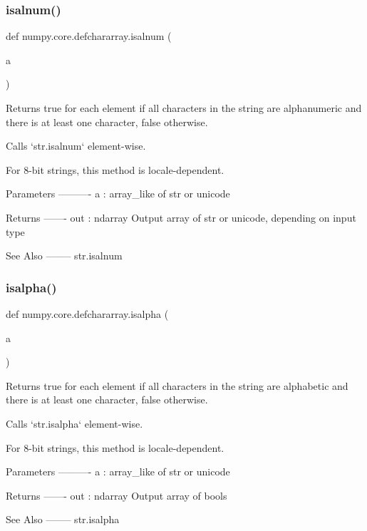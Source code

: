 \subsubsection{\texorpdfstring{isalnum()}{isalnum()}}
{\footnotesize\ttfamily def numpy.\+core.\+defchararray.\+isalnum (\begin{DoxyParamCaption}\item[{}]{a }\end{DoxyParamCaption})}

\begin{DoxyVerb}Returns true for each element if all characters in the string are
alphanumeric and there is at least one character, false otherwise.

Calls `str.isalnum` element-wise.

For 8-bit strings, this method is locale-dependent.

Parameters
----------
a : array_like of str or unicode

Returns
-------
out : ndarray
    Output array of str or unicode, depending on input type

See Also
--------
str.isalnum
\end{DoxyVerb}
 \mbox{\label{namespacenumpy_1_1core_1_1defchararray_a8b11c782e2ae766787863211cd831dba}} 
\subsubsection{\texorpdfstring{isalpha()}{isalpha()}}
{\footnotesize\ttfamily def numpy.\+core.\+defchararray.\+isalpha (\begin{DoxyParamCaption}\item[{}]{a }\end{DoxyParamCaption})}

\begin{DoxyVerb}Returns true for each element if all characters in the string are
alphabetic and there is at least one character, false otherwise.

Calls `str.isalpha` element-wise.

For 8-bit strings, this method is locale-dependent.

Parameters
----------
a : array_like of str or unicode

Returns
-------
out : ndarray
    Output array of bools

See Also
--------
str.isalpha
\end{DoxyVerb}
 \mbox{\label{namespacenumpy_1_1core_1_1defchararray_ac31769a84ca9653b41de60d7d890631f}} 
